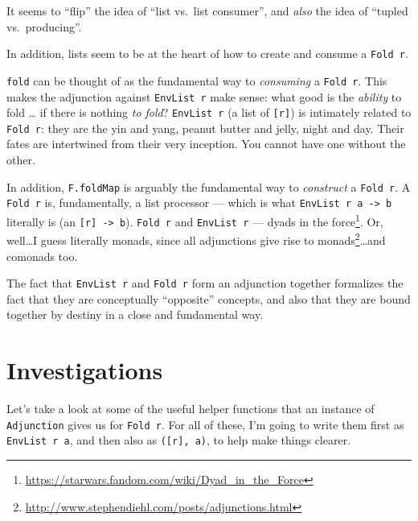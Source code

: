 \documentclass[]{article}
\renewcommand{\href}[2]{#2\footnote{\url{#1}}}
\begin{document}
It seems to ``flip'' the idea of ``list vs.~list consumer'', and \emph{also} the
idea of ``tupled vs.~producing''.

In addition, lists seem to be at the heart of how to create and consume a
\texttt{Fold\ r}.

\texttt{fold} can be thought of as the fundamental way to \emph{consuming} a
\texttt{Fold\ r}. This makes the adjunction against \texttt{EnvList\ r} make
sense: what good is the \emph{ability} to fold \ldots{} if there is nothing
\emph{to fold}? \texttt{EnvList\ r} (a list of \texttt{{[}r{]}}) is intimately
related to \texttt{Fold\ r}: they are the yin and yang, peanut butter and jelly,
night and day. Their fates are intertwined from their very inception. You cannot
have one without the other.

In addition, \texttt{F.foldMap} is arguably the fundamental way to
\emph{construct} a \texttt{Fold\ r}. A \texttt{Fold\ r} is, fundamentally, a
list processor --- which is what \texttt{EnvList\ r\ a\ -\textgreater{}\ b}
literally is (an \texttt{{[}r{]}\ -\textgreater{}\ b}). \texttt{Fold\ r} and
\texttt{EnvList\ r} ---
\href{https://starwars.fandom.com/wiki/Dyad_in_the_Force}{dyads in the force}.
Or, well\ldots I guess literally monads, since
\href{http://www.stephendiehl.com/posts/adjunctions.html}{all adjunctions give
rise to monads}\ldots and comonads too.

The fact that \texttt{EnvList\ r} and \texttt{Fold\ r} form an adjunction
together formalizes the fact that they are conceptually ``opposite'' concepts,
and also that they are bound together by destiny in a close and fundamental way.

\hypertarget{investigations}{%
\section{Investigations}\label{investigations}}

Let's take a look at some of the useful helper functions that an instance of
\texttt{Adjunction} gives us for \texttt{Fold\ r}. For all of these, I'm going
to write them first as \texttt{EnvList\ r\ a}, and then also as
\texttt{({[}r{]},\ a)}, to help make things clearer.
\end{document}

